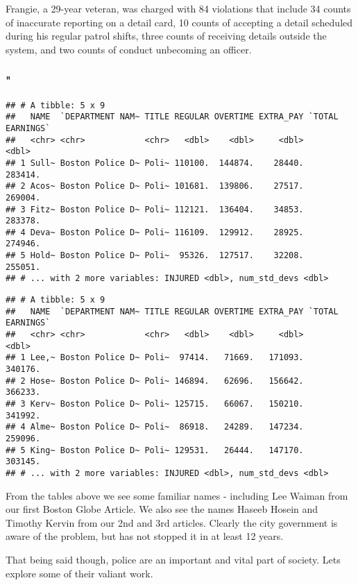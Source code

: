 \documentclass[]{article}
\begin{document}
Frangie, a 29-year veteran, was charged with 84 violations that include
34 counts of inaccurate reporting on a detail card, 10 counts of
accepting a detail scheduled during his regular patrol shifts, three
counts of receiving details outside the system, and two counts of
conduct unbecoming an officer.

\subsubsection{"}\label{section-1}

\begin{verbatim}
## # A tibble: 5 x 9
##   NAME  `DEPARTMENT NAM~ TITLE REGULAR OVERTIME EXTRA_PAY `TOTAL EARNINGS`
##   <chr> <chr>            <chr>   <dbl>    <dbl>     <dbl>            <dbl>
## 1 Sull~ Boston Police D~ Poli~ 110100.  144874.    28440.          283414.
## 2 Acos~ Boston Police D~ Poli~ 101681.  139806.    27517.          269004.
## 3 Fitz~ Boston Police D~ Poli~ 112121.  136404.    34853.          283378.
## 4 Deva~ Boston Police D~ Poli~ 116109.  129912.    28925.          274946.
## 5 Hold~ Boston Police D~ Poli~  95326.  127517.    32208.          255051.
## # ... with 2 more variables: INJURED <dbl>, num_std_devs <dbl>
\end{verbatim}

\begin{verbatim}
## # A tibble: 5 x 9
##   NAME  `DEPARTMENT NAM~ TITLE REGULAR OVERTIME EXTRA_PAY `TOTAL EARNINGS`
##   <chr> <chr>            <chr>   <dbl>    <dbl>     <dbl>            <dbl>
## 1 Lee,~ Boston Police D~ Poli~  97414.   71669.   171093.          340176.
## 2 Hose~ Boston Police D~ Poli~ 146894.   62696.   156642.          366233.
## 3 Kerv~ Boston Police D~ Poli~ 125715.   66067.   150210.          341992.
## 4 Alme~ Boston Police D~ Poli~  86918.   24289.   147234.          259096.
## 5 King~ Boston Police D~ Poli~ 129531.   26444.   147170.          303145.
## # ... with 2 more variables: INJURED <dbl>, num_std_devs <dbl>
\end{verbatim}

From the tables above we see some familiar names - including Lee Waiman
from our first Boston Globe Article. We also see the names Haseeb Hosein
and Timothy Kervin from our 2nd and 3rd articles. Clearly the city
government is aware of the problem, but has not stopped it in at least
12 years.

That being said though, police are an important and vital part of
society. Lets explore some of their valiant work.
\end{document}
